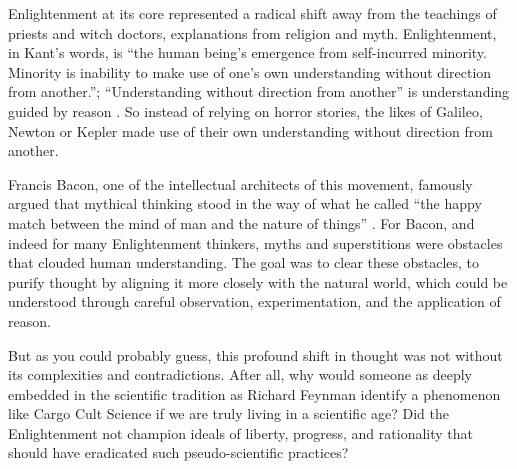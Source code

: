 Enlightenment at its core represented a radical shift away from the teachings
of priests and witch doctors, explanations from religion and myth.
Enlightenment, in Kant's words, is \enquote{the human being's emergence from
self-incurred minority. Minority is inability to make use of one's own
understanding without direction from another.}; \enquote{Understanding without
direction from another} is understanding guided by reason
\cite{kantBeantwortungFrageWas1784,kantKritikReinenVernunft1781}. So instead of
relying on horror stories, the likes of Galileo, Newton or Kepler made use of
their own understanding without direction from another.

Francis Bacon, one of the intellectual architects of this movement, famously
argued that mythical thinking stood in the way of what he called \enquote{the happy
match between the mind of man and the nature of things}
\cite{baconWorksFrancisBacon2011}. For Bacon, and indeed
for many Enlightenment thinkers, myths and superstitions were obstacles that
clouded human understanding. The goal was to clear these obstacles, to purify
thought by aligning it more closely with the natural world, which could be
understood through careful observation, experimentation, and the application of
reason.


%

But as you could probably guess, this profound shift in thought was not without
its complexities and contradictions. After all, why would someone as deeply
embedded in the scientific tradition as Richard Feynman identify a phenomenon
like Cargo Cult Science if we are truly living in a scientific age? Did the
Enlightenment not champion ideals of liberty, progress, and rationality that
should have eradicated such pseudo-scientific practices?

